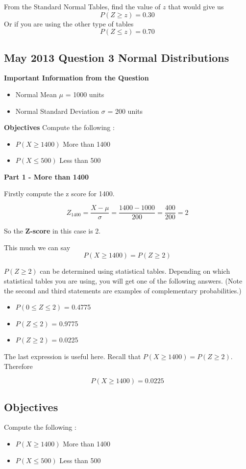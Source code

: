 ﻿\documentclass[]{report}
\begin{document}
From the Standard Normal Tables, find the value of $z$ that would give us
\[ P(Z \geq z) = 0.30 \]
Or if you are using the other type of tables 
\[ P(Z \leq z) = 0.70  \]


\subsection{May 2013 Question 3 Normal Distributions}

\noindent \textbf{Important Information from the Question}
\begin{itemize}
	\item Normal Mean $\mu$ = 1000 units
	\item Normal Standard Deviation $\sigma$ = 200 units 
\end{itemize}

\noindent \textbf{Objectives}
Compute the following : 
\begin{itemize}
	\item $P(X \geq 1400 )$ More than 1400
	\item $P(X \leq 500)$ Less than 500
\end{itemize}


\noindent \textbf{Part 1 -  More than 1400}

Firstly compute the z score for 1400.

\[ Z_{1400} =  \frac{X - \mu}{\sigma} = \frac{1400 - 1000}{200} = \frac{400}{200} = 2  \]

So the \textbf{Z-score} in this case is 2.

This much we can say
\[P(X \geq 1400) = P(Z \geq 2)\]

$P(Z \geq 2)$ can be determined using statistical tables.
Depending on which statistical tables you are using, you will get one of the following answers. (Note the 
second and third statements are examples of complementary probabilities.)
\begin{itemize}
	\item $P (0 \leq Z \leq 2)$ = 0.4775
	\item $P ( Z \leq 2)$ = 0.9775
	\item $P ( Z \geq 2)$ = 0.0225
\end{itemize}
The last expression is useful here. Recall that $P(X \geq 1400) = P(Z \geq 2)$. Therefore

\[P(X \geq 1400) = 0.0225\]


\subsection*{Objectives}
Compute the following : 
\begin{itemize}
	\item $P(X \geq 1400 )$ More than 1400
	\item $P(X \leq 500)$ Less than 500
\end{itemize}
\end{document}

